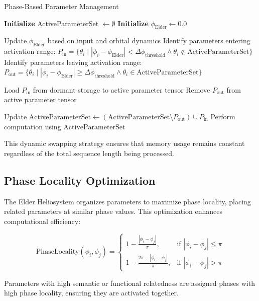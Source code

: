 \begin{algorithm}
\caption{Phase-Based Parameter Management}
\begin{algorithmic}[1]
\State \textbf{Initialize} ActiveParameterSet $\gets \emptyset$
\State \textbf{Initialize} $\phi_{\text{Elder}} \gets 0.0$

    \State Update $\phi_{\text{Elder}}$ based on input and orbital dynamics
    \State Identify parameters entering activation range: $P_{\text{in}} = \{\theta_i \mid |\phi_i - \phi_{\text{Elder}}| < \Delta\phi_{\text{threshold}} \land \theta_i \notin \text{ActiveParameterSet}\}$
    \State Identify parameters leaving activation range: $P_{\text{out}} = \{\theta_i \mid |\phi_i - \phi_{\text{Elder}}| \geq \Delta\phi_{\text{threshold}} \land \theta_i \in \text{ActiveParameterSet}\}$
    
    \State Load $P_{\text{in}}$ from dormant storage to active parameter tensor
    \State Remove $P_{\text{out}}$ from active parameter tensor
    
    \State Update $\text{ActiveParameterSet} \gets (\text{ActiveParameterSet} \setminus P_{\text{out}}) \cup P_{\text{in}}$
    \State Perform computation using $\text{ActiveParameterSet}$
\EndWhile
\end{algorithmic}
\end{algorithm}

This dynamic swapping strategy ensures that memory usage remains constant regardless of the total sequence length being processed.

\subsection{Phase Locality Optimization}

The Elder Heliosystem organizes parameters to maximize phase locality, placing related parameters at similar phase values. This optimization enhances computational efficiency:

\begin{equation}
\text{PhaseLocality}(\phi_i, \phi_j) = \begin{cases}
1 - \frac{|\phi_i - \phi_j|}{\pi}, & \text{if } |\phi_i - \phi_j| \leq \pi \\
1 - \frac{2\pi - |\phi_i - \phi_j|}{\pi}, & \text{if } |\phi_i - \phi_j| > \pi
\end{cases}
\end{equation}

Parameters with high semantic or functional relatedness are assigned phases with high phase locality, ensuring they are activated together.

